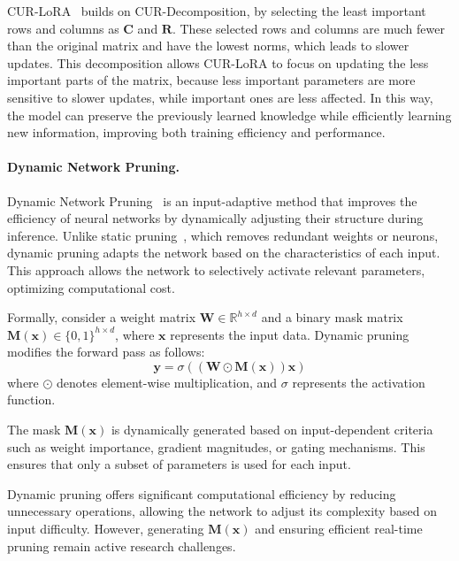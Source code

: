CUR-LoRA~\citep{https://doi.org/10.5281/zenodo.12730055} builds on CUR-Decomposition, by selecting the least important rows and columns as \( \boldsymbol{C} \) and \( \boldsymbol{R} \). These selected rows and columns are much fewer than the original matrix and have the lowest norms, which leads to slower updates. This decomposition allows CUR-LoRA to focus on updating the less important parts of the matrix, because less important parameters are more sensitive to slower updates, while important ones are less affected. In this way, the model can preserve the previously learned knowledge while efficiently learning new information, improving both training efficiency and performance.


\paragraph{Dynamic Network Pruning.}  
Dynamic Network Pruning~\citep{lin2020dynamicmodelpruningfeedback}  is an input-adaptive method that improves the efficiency of neural networks by dynamically adjusting their structure during inference. Unlike static pruning~\citep{siciliano2024staticpruningdenseretrieval}, which removes redundant weights or neurons, dynamic pruning adapts the network based on the characteristics of each input. This approach allows the network to selectively activate relevant parameters, optimizing computational cost.

Formally, consider a weight matrix \( \boldsymbol{W} \in \mathbb{R}^{h \times d} \) and a binary mask matrix \( \boldsymbol{M}(\boldsymbol{x}) \in \{0, 1\}^{h \times d} \), where \( \boldsymbol{x} \) represents the input data. Dynamic pruning modifies the forward pass as follows:
\[
    \boldsymbol{y} = \sigma \left( (\boldsymbol{W} \odot \boldsymbol{M}(\boldsymbol{x})) \boldsymbol{x} \right)
\]
where \( \odot \) denotes element-wise multiplication, and \( \sigma \) represents the activation function.

The mask \( \boldsymbol{M}(\boldsymbol{x}) \) is dynamically generated based on input-dependent criteria such as weight importance, gradient magnitudes, or gating mechanisms. This ensures that only a subset of parameters is used for each input.

Dynamic pruning offers significant computational efficiency by reducing unnecessary operations, allowing the network to adjust its complexity based on input difficulty. However, generating \( \boldsymbol{M}(\boldsymbol{x}) \) and ensuring efficient real-time pruning remain active research challenges.




